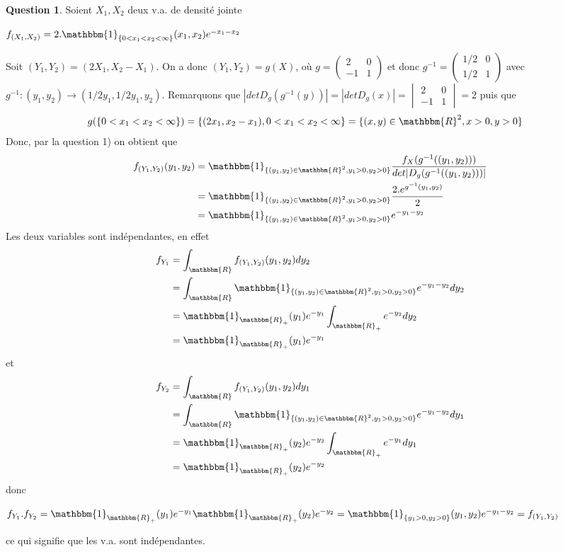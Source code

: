 \documentclass[12pt]{article}
\newcommand{\R}{\mathbbm{R}}
\newcommand{\1}{\mathbbm{1}}
\theoremstyle{definition}\newtheorem{defn}{Définition}
\theoremstyle{definition}\newtheorem{exm}{Exemple}
\theoremstyle{definition}\newtheorem{rem}{Remarque}
\theoremstyle{definition}\newtheorem{algo}{Algorithme}
\theoremstyle{remark}\newtheorem{exo}{Exercice}
\theoremstyle{remark}\newtheorem{nota}{Notation}
\theoremstyle{definition}\newtheorem{1q}{Question}
\theoremstyle{definition}\newtheorem{2q}{Question}
\theoremstyle{definition}\newtheorem{3q}{Question}
\theoremstyle{definition}\newtheorem{4q}{Question}
\theoremstyle{definition}\newtheorem{2qs1}{}
\theoremstyle{definition}\newtheorem{2qs2}{}
\theoremstyle{definition}\newtheorem{2qs3}{}
\theoremstyle{definition}\newtheorem{2qs4}{}
\theoremstyle{definition}\newtheorem{4qs2}{}
\theoremstyle{definition}\newtheorem{4qs3}{}
\begin{document}
\begin{1q}	
Soient $X_1, X_2$ deux v.a. de densité jointe 
\begin{center}$f_{(X_1, X_2)} = 2.\1_{\{0<x_1<x_2<\infty\}}(x_1,x_2)e^{-x_1-x_2}$\end{center}
Soit $(Y_1, Y_2) = (2X_1, X_2-X_1)$.\newline
On a donc $(Y_1, Y_2) = g(X)$, où $g=\begin{pmatrix}2&0\\-1&1\end{pmatrix}$ et donc \newline
$g^{-1}=\begin{pmatrix}1/2&0\\1/2&1\end{pmatrix}$ avec $g^{-1}: (y_1, y_2)\longrightarrow (1/2y_1, 1/2y_1,y_2)$.\newline
Remarquons que $|detD_g(g^{-1}(y))|=|detD_g(x)|= \begin{vmatrix}2&0\\-1&1\end{vmatrix}=2$ puis que 
\begin{align*}
g(\{0<x_1<x_2<\infty\})&=\{(2x_1,x_2-x_1), 0<x_1<x_2<\infty\}=\{(x,y)\in\R^2, x>0, y>0\}
\end{align*}
Donc, par la question 1) on obtient que 
\begin{align*}
 f_{(Y_1,Y_2)}(y_1,y_2) &= \1_{\{(y_1,y_2)\in\R^2, y_1>0, y_2>0\}}\frac{f_X(g^{-1}((y_1,y_2)))}{det|D_g(g^{-1}((y_1,y_2)))|}\\
 &=  \1_{\{(y_1,y_2)\in\R^2, y_1>0, y_2>0\}}\frac{2.e^{g^{-1}(y_1,y_2)}}{2}\\
 &=  \1_{\{(y_1,y_2)\in\R^2, y_1>0, y_2>0\}}e^{-y_1-y_2}\\
\end{align*}
Les deux variables sont indépendantes, en effet
\begin{align*}
f_{Y_1}&=\int_\R  f_{(Y_1,Y_2)}(y_1,y_2) dy_2\\
&=\int_\R  \1_{\{(y_1,y_2)\in\R^2, y_1>0, y_2>0\}}e^{-y_1-y_2}dy_2\\
&=\1_{\R_+}(y_1)e^{-y_1}\int_{\R_+}e^{-y_2}dy_2\\
&=\1_{\R_+}(y_1)e^{-y_1}
\end{align*}
et
\begin{align*}
f_{Y_2}&=\int_\R  f_{(Y_1,Y_2)}(y_1,y_2) dy_1\\
&=\int_\R  \1_{\{(y_1,y_2)\in\R^2, y_1>0, y_2>0\}}e^{-y_1-y_2}dy_1\\
&=\1_{\R_+}(y_2)e^{-y_2}\int_{\R_+}e^{-y_1}dy_1\\
&=\1_{\R_+}(y_2)e^{-y_2}
\end{align*}
donc 
\begin{center}$f_{Y_1}.f_{Y_2}= \1_{\R_+}(y_1)e^{-y_1}\1_{\R_+}(y_2)e^{-y_2}= \1_{\{y_1>0, y_2>0\}}(y_1,y_2)e^{-y_1-y_2}=f_{(Y_1,Y_2)}$\end{center} ce qui signifie que les v.a. sont indépendantes.
\end{1q}
\end{document}
